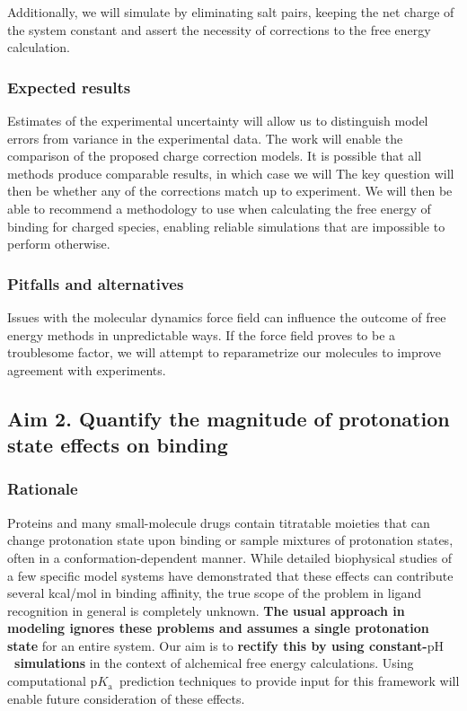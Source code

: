 \documentclass[10pt,final]{article}
\newcommand{\pKa}{$\mathrm{p}K_\mathrm{a}$\ }
\newcommand{\pH}{$\mathrm{pH}$\ }
\begin{document}
Additionally, we will simulate by eliminating salt pairs, keeping the net charge of the system constant and assert the necessity of corrections to the free energy calculation.

\subsubsection*{Expected results}
Estimates of the experimental uncertainty will allow us to distinguish model errors from variance in the experimental data.
The work will enable the comparison of the proposed charge correction models. It is possible that all methods produce comparable results, in which case we will
The key question will then be whether any of the corrections  match up to experiment.
We will then be able to recommend a methodology to use when calculating the free energy of binding for charged species, enabling reliable simulations that are impossible to perform otherwise.
\subsubsection*{Pitfalls and alternatives}

Issues with the molecular dynamics force field can influence the outcome of free energy methods in unpredictable ways. If the force field proves to be a troublesome factor, we will attempt to reparametrize our molecules to improve agreement with experiments.

\subsection*{Aim 2. Quantify the magnitude of protonation state effects on binding}
\subsubsection*{Rationale}
Proteins and many small-molecule drugs contain titratable moieties that can change protonation state upon binding or sample mixtures of protonation states, often in a conformation-dependent manner.
While detailed biophysical studies of a few specific model systems have demonstrated that these effects can contribute several kcal/mol in binding affinity\cite{Aleksandrov2007a,Czodrowski2007a,Neeb2014a}, the true scope of the problem in ligand recognition in general is completely unknown.
\textbf{The usual approach in modeling ignores these problems and assumes a single protonation state} for an entire system. Our aim is to \textbf{rectify this by using constant-\pH simulations} in the context of alchemical free energy calculations. Using computational \pKa prediction techniques to provide input for this framework will enable future consideration of these effects.
\end{document}
